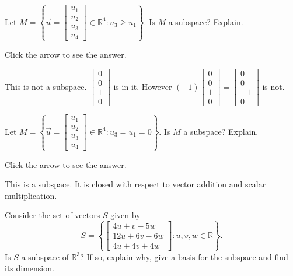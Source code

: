 \documentclass{ximera}
\begin{document}
\begin{problem}\label{prb:5.14} Let $M=\left\{ \vec{u}=\left[
\begin{array}{c}
u_{1} \\
u_{2} \\
u_{3} \\
u_{4}
\end{array}
\right] \in
\mathbb{R}^{4}:u_{3}\geq u_{1}\right\} .$ Is $M$ a subspace? Explain.

Click the arrow to see the answer.  
\begin{expandable}
This
is not a subspace. $\left[ \begin{array}{r}
0 \\
0 \\
1 \\
0
\end{array}
\right] $ is in it. However $(-1) \left[ \begin{array}{r}
0 \\
0 \\
1 \\
0
\end{array}
\right]  = \left[ \begin{array}{r}
0 \\
0 \\
-1 \\
0
\end{array}
\right] $ is not.
\end{expandable}
\end{problem}

\begin{problem}\label{prb:5.15} Let $M=\left\{ \vec{u}=\left[
\begin{array}{c}
u_{1} \\
u_{2} \\
u_{3} \\
u_{4}
\end{array}\right] \in
\mathbb{R}^{4}:u_{3}=u_{1}=0\right\} .$ Is $M$ a subspace? Explain.

Click the arrow to see the answer.  
\begin{expandable}
This is a subspace. It is closed with respect to vector addition and scalar
multiplication.
\end{expandable}
\end{problem}

\begin{problem}\label{prb:5.16} Consider the set of vectors $S$ given by
\begin{equation*}
S =
\left\{ \left[
\begin{array}{c}
4u+v-5w \\
12u+6v-6w \\
4u+4v+4w
\end{array}
\right] :u,v,w\in \mathbb{R}\right\} .
\end{equation*}
Is $S$ a subspace of $\mathbb{R}^{3}?$ If so, explain why,
give a basis for the subspace and find its dimension.
\end{problem}
\end{document}
